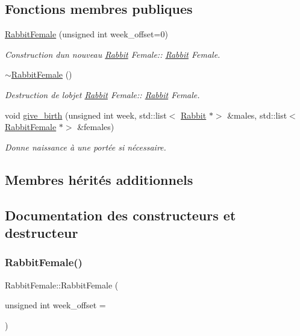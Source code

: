 \subsection*{Fonctions membres publiques}
\begin{DoxyCompactItemize}
\item 
\hyperlink{classRabbitFemale_afc3b2704f27fcf00365f4c3e8bd833bd}{Rabbit\+Female} (unsigned int week\+\_\+offset=0)
\begin{DoxyCompactList}\small\item\em Construction d\textquotesingle{}un nouveau \hyperlink{classRabbit}{Rabbit} Female\+:\+: \hyperlink{classRabbit}{Rabbit} Female. \end{DoxyCompactList}\item 
\hyperlink{classRabbitFemale_a647e3ccc4f2def58440a8faf2855d579}{$\sim$\+Rabbit\+Female} ()
\begin{DoxyCompactList}\small\item\em Destruction de l\textquotesingle{}objet \hyperlink{classRabbit}{Rabbit} Female\+:\+: \hyperlink{classRabbit}{Rabbit} Female. \end{DoxyCompactList}\item 
void \hyperlink{classRabbitFemale_adc6ed8ce0605e19fcbc2c21ac43db8ee}{give\+\_\+birth} (unsigned int week, std\+::list$<$ \hyperlink{classRabbit}{Rabbit} $\ast$$>$ \&males, std\+::list$<$ \hyperlink{classRabbitFemale}{Rabbit\+Female} $\ast$$>$ \&females)
\begin{DoxyCompactList}\small\item\em Donne naissance à une portée si nécessaire. \end{DoxyCompactList}\end{DoxyCompactItemize}
\subsection*{Membres hérités additionnels}


\subsection{Documentation des constructeurs et destructeur}
\mbox{\label{classRabbitFemale_afc3b2704f27fcf00365f4c3e8bd833bd}} 
\subsubsection{\texorpdfstring{Rabbit\+Female()}{RabbitFemale()}}
{\footnotesize\ttfamily Rabbit\+Female\+::\+Rabbit\+Female (\begin{DoxyParamCaption}\item[{unsigned int}]{week\+\_\+offset = {} }\end{DoxyParamCaption})}



